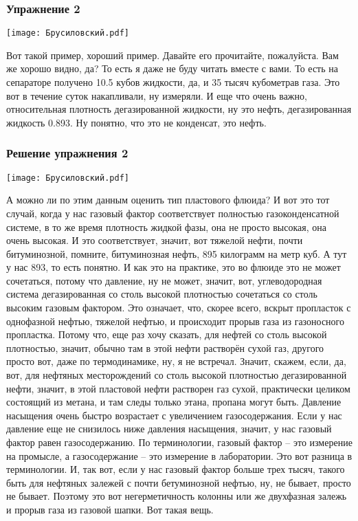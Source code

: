 \documentclass[main.tex]{subfiles}
\begin{document}
\subsubsection{Упражнение 2}

\begin{center}
\texttt{[image: Брусиловский.pdf]}
\end{center}

Вот такой пример, хороший пример.
Давайте его прочитайте, пожалуйста.
Вам же хорошо видно, да?
То есть я даже не буду читать вместе с вами.
То есть на сепараторе получено 10.5 кубов жидкости, да, и 35 тысяч кубометрав газа.
Это вот в течение суток накапливали, ну измеряли.
И еще что очень важно, относительная плотность дегазированной жидкости, ну это нефть, дегазированная жидкость 0.893.
Ну понятно, что это не конденсат, это нефть.

\subsubsection{Решение упражнения 2}

\begin{center}
\texttt{[image: Брусиловский.pdf]}
\end{center}

А можно ли по этим данным оценить тип пластового флюида?
И вот это тот случай, когда у нас газовый фактор соответствует полностью газоконденсатной системе, в то же время плотность жидкой фазы, она не просто высокая, она очень высокая.
И это соответствует, значит, вот тяжелой нефти, почти битуминозной, помните, битуминозная нефть, 895 килограмм на метр куб.
А тут у нас 893, то есть понятно.
И как это на практике, это во флюиде это не может сочетаться, потому что давление, ну не может, значит, вот, углеводородная система дегазированная со столь высокой плотностью сочетаться со столь высоким газовым фактором.
Это означает, что, скорее всего, вскрыт пропласток с однофазной нефтью, тяжелой нефтью, и происходит прорыв газа из газоносного пропластка.
Потому что, еще раз хочу сказать, для нефтей со столь высокой плотностью, значит, обычно там в этой нефти растворён сухой газ, другого просто вот, даже по термодинамике, ну, я не встречал.
Значит, скажем, если, да, вот, для нефтяных месторождений со столь высокой плотностью дегазированной нефти, значит, в этой пластовой нефти растворен газ сухой, практически целиком состоящий из метана, и там следы только этана, пропана могут быть.
Давление насыщения очень быстро возрастает с увеличением газосодержания.
Если у нас давление еще не снизилось ниже давления насыщения, значит, у нас газовый фактор равен газосодержанию.
По терминологии, газовый фактор -- это измерение на промысле, а газосодержание -- это измерение в лаборатории.
Это вот разница в терминологии.
И, так вот, если у нас газовый фактор больше трех тысяч, такого быть для нефтяных залежей с почти бетуминозной нефтью, ну, не бывает, просто не бывает.
Поэтому это вот негерметичность колонны или же двухфазная залежь и прорыв газа из газовой шапки. Вот такая вещь.
\end{document}
